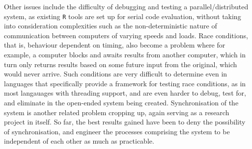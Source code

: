 Other issues include the difficulty of debugging and testing a parallel/distributed system, as existing \texttt{R} tools are set up for serial code evaluation, without taking into consideration complexities such as the non-deterministic nature of communication between computers of varying speeds and loads.
Race conditions, that is, behaviour dependent on timing, also become a problem where for example, a computer blocks and awaits results from another computer, which in turn only returns results based on some future input from the original, which would never arrive.
Such conditions are very difficult to determine even in languages that specifically provide a framework for testing race conditions, as in most langauages with threading support, and are even harder to debug, test for, and eliminate in the open-ended system being created\cite{serebryany2009threadsanitizer}.
Synchronisation of the system is another related problem cropping up, again serving as a research project in itself.
So far, the best results gained have been to deny the possibility of synchronisation, and engineer the processes comprising the system to be independent of each other as much as practicable.
